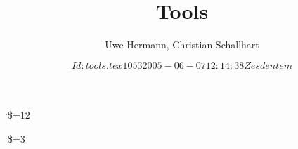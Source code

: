 \documentclass[a4paper, 11pt]{book}
\begin{document}
\title{\SYNEIGHTLOGO\\\vspace{1cm}Tools}
\author{Uwe Hermann, Christian Schallhart}
\catcode`\$=12
\date{\texttt{$Id: tools.tex 1053 2005-06-07 12:14:38Z esdentem $}}
\catcode`\$=3
\maketitle
\tableofcontents

\newpage







\end{document}
